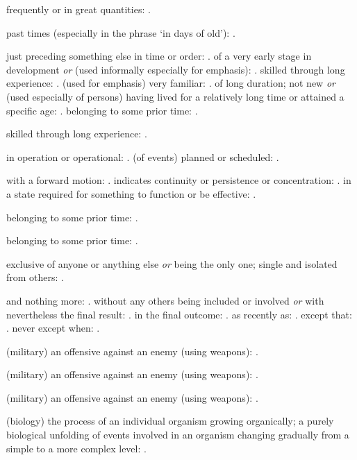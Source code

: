   frequently or in great quantities: .

  past times (especially in the phrase `in days of old'): .

  just preceding something else in time or order: . of a very early stage in development \textit{or} (used informally especially for emphasis): . skilled through long experience: . (used for emphasis) very familiar: . of long duration; not new \textit{or} (used especially of persons) having lived for a relatively long time or attained a specific age: . belonging to some prior time: .

  skilled through long experience: .

  in operation or operational: . (of events) planned or scheduled: .

  with a forward motion: . indicates continuity or persistence or concentration: . in a state required for something to function or be effective: .

  belonging to some prior time: .

  belonging to some prior time: .

  exclusive of anyone or anything else \textit{or} being the only one; single and isolated from others: .

  and nothing more: . without any others being included or involved \textit{or} with nevertheless the final result: . in the final outcome: . as recently as: . except that: . never except when: .

  (military) an offensive against an enemy (using weapons): .

  (military) an offensive against an enemy (using weapons): .

  (military) an offensive against an enemy (using weapons): .

  (biology) the process of an individual organism growing organically; a purely biological unfolding of events involved in an organism changing gradually from a simple to a more complex level: .

